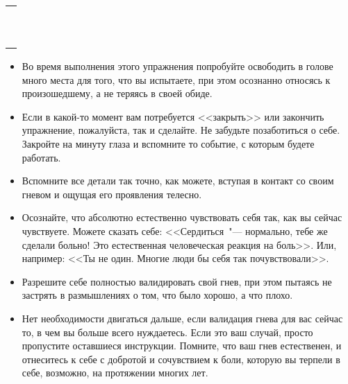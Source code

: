 \setlength{\extrarowheight}{2mm}
\begin{tabularx}{\textwidth}{X}
	\\
	\arrayrulecolor{gray}\hline\\
	\hline\\
	\hline\\
	\hline\\
	\hline\\
	\hline\\	
	\hline\\
	\hline\\
	\hline\\
	\hline\\
	\hline\\
\end{tabularx}
\setlength{\extrarowheight}{0mm}
\begin{itemize}
	\item Во время выполнения этого упражнения попробуйте освободить в голове много места для того, что вы испытаете, при этом осознанно относясь к произошедшему, а не теряясь в своей обиде.
	
	\item Если в какой-то момент вам потребуется <<закрыть>> или закончить упражнение, пожалуйста, так и сделайте. Не забудьте позаботиться о себе. Закройте на минуту глаза и вспомните то событие, с которым будете работать.
	
	\item Вспомните все детали так точно, как можете, вступая в контакт со своим гневом и ощущая его проявления телесно.
	
	\item Осознайте, что абсолютно естественно чувствовать себя так, как вы сейчас чувствуете. Можете сказать себе: <<Сердиться~"--- нормально, тебе же сделали больно! Это естественная человеческая реакция на боль>>. Или, например: <<Ты не один. Многие люди бы себя так почувствовали>>.
	
	\item Разрешите себе полностью валидировать свой гнев, при этом пытаясь не застрять в размышлениях о том, что было хорошо, а что плохо.
	
	\item Нет необходимости двигаться дальше, если валидация гнева для вас сейчас то, в чем вы больше всего нуждаетесь. Если это ваш случай, просто пропустите оставшиеся инструкции. Помните, что ваш гнев естественен, и отнеситесь к себе с добротой и сочувствием к боли, которую вы терпели в себе, возможно, на протяжении многих лет.
\end{itemize}
 
